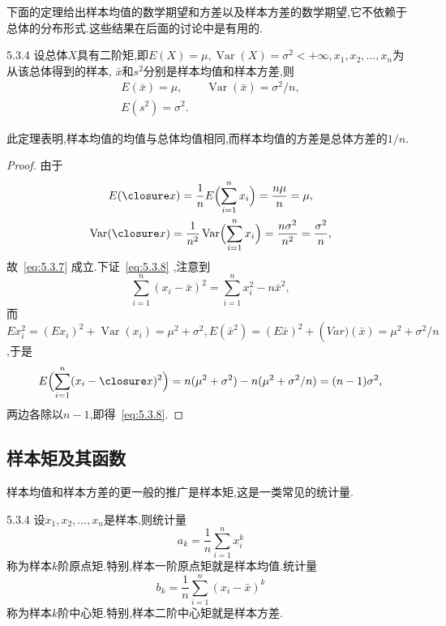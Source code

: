 下面的定理给出样本均值的数学期望和方差以及样本方差的数学期望,它不依赖于总体的分布形式.这些结果在后面的讨论中是有用的.
\begin{theorem}{}{5.3.4}
设总体$X$具有二阶矩,即$E(X)=\mu,\operatorname{Var}(X)=\sigma^2<+\infty,x_1,x_2,\dotsc,x_n$为从该总体得到的样本, $\bar x$和$s^2$分别是样本均值和样本方差,则
\begin{gather}
E(\bar x)=\mu,\qquad\operatorname{Var}(\bar x)=\sigma^2/n,\label{eq:5.3.7}\\
E(s^2)=\sigma^2.\label{eq:5.3.8}
\end{gather}
\end{theorem}
此定理表明,样本均值的均值与总体均值相同,而样本均值的方差是总体方差的$1/n$.
\begin{proof}
由于
\begin{gather*}
E(\bar x)=\frac1nE\Bigl(\sum_{i=1}^nx_i\Bigr)=\frac{n\mu}n=\mu,\\
\operatorname{Var}(\bar x)=\frac1{n^2}\operatorname{Var}\Bigl(\sum_{i=1}^nx_i\Bigr)
=\frac{n\sigma^2}{n^2}=\frac{\sigma^2}n,
\end{gather*}
故~\eqref{eq:5.3.7} 成立.下证~\eqref{eq:5.3.8} ,注意到
\[\sum_{i=1}^n(x_i-\bar x)^2=\sum_{i=1}^nx_i^2-n\bar x^2,\]
而$Ex_i^2=(Ex_i)^2+\operatorname{Var}(x_i)=\mu^2+\sigma^2,E(\bar x^2)=(E\bar x)^2+\operatorname(Var)(\bar x)=\mu^2+\sigma^2/n$,于是
\[E\Bigl(\sum_{i=1}^n(x_i-\bar x)^2\Bigr)=n(\mu^2+\sigma^2)-n(\mu^2+\sigma^2/n)=(n-1)\sigma^2,\]
两边各除以$n-1$,即得~\eqref{eq:5.3.8}.
\end{proof}
\subsection{样本矩及其函数\label{ssec:5.3.4}}
样本均值和样本方差的更一般的推广是样本矩,这是一类常见的统计量.
\begin{definition}{}{5.3.4}
设$x_1,x_2,\dotsc,x_n$是样本,则统计量
\begin{equation}\label{eq:5.3.9}
a_k=\frac1n\sum_{i=1}^nx_i^k
\end{equation}
称为样本$k$阶原点矩.特别,样本一阶原点矩就是样本均值.统计量
\begin{equation}\label{eq:5.3.10}
b_k=\frac1n\sum_{i=1}^n(x_i-\bar x)^k
\end{equation}
称为样本$k$阶中心矩.特别,样本二阶中心矩就是样本方差.
\end{definition}

